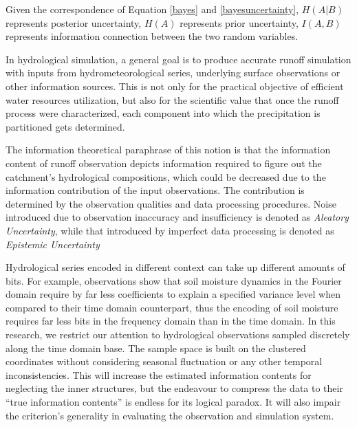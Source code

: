 \documentclass[draft,wrr]{AGUTeX}
\begin{document}
\begin{article}
Given the correspondence of  Equation \eqref{bayes} and \eqref{bayesuncertainty}, $H(A|B)$  represents posterior uncertainty, $H(A)$ represents prior uncertainty, $I(A,B)$ represents information connection between the two random variables. 

In hydrological simulation, a general goal is to produce accurate runoff simulation with inputs from hydrometeorological series, underlying surface observations or other information sources. This is not only for the practical objective of efficient water resources utilization, but also for the scientific value that once the runoff process were characterized, each component into which the precipitation is partitioned gets determined. 

The information theoretical paraphrase of this notion is that the information content of runoff observation depicts information required to figure out the catchment's hydrological compositions, which could be decreased due to the information contribution of the input observations. The contribution is determined by the observation qualities and data processing procedures.
Noise introduced due to observation inaccuracy and insufficiency is denoted as \emph{Aleatory Uncertainty}, while that introduced by imperfect data processing is denoted as \emph{Epistemic Uncertainty}



Hydrological series encoded in different context can take up different amounts of bits. For example,  observations show that  soil
moisture dynamics in the Fourier domain require by far less
coefficients to explain a specified variance level when
compared to their time domain counterpart\citep{katul2007spectrum}, thus the encoding of soil moisture requires far less bits in the frequency domain than in the time domain. In this research, we restrict our attention to hydrological observations sampled discretely along the time domain base. The sample space is built on the clustered coordinates without considering seasonal fluctuation or any other temporal inconsistencies. This will increase the estimated information contents for neglecting the inner structures, but the endeavour to compress the data to their ``true information contents'' is endless for its logical paradox\citep{li2009introduction}. It will also impair the criterion's generality in evaluating the observation and simulation system.  


\end{article}
\end{document}
